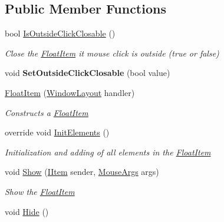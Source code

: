 \subsection*{Public Member Functions}
\begin{DoxyCompactItemize}
\item 
bool \mbox{\hyperlink{class_space_v_i_l_1_1_float_item_a491aaaddc768c4676ecfb5c7405ec167}{Is\+Outside\+Click\+Closable}} ()
\begin{DoxyCompactList}\small\item\em Close the \mbox{\hyperlink{class_space_v_i_l_1_1_float_item}{Float\+Item}} it mouse click is outside (true or false) \end{DoxyCompactList}\item 
\mbox{\label{class_space_v_i_l_1_1_float_item_a1e7c8a8d2ba5875d5bc9713a35ea4d36}} 
void {\bfseries Set\+Outside\+Click\+Closable} (bool value)
\item 
\mbox{\hyperlink{class_space_v_i_l_1_1_float_item_af80858fea5cd334aeea694ad34f9e9e6}{Float\+Item}} (\mbox{\hyperlink{class_space_v_i_l_1_1_window_layout}{Window\+Layout}} handler)
\begin{DoxyCompactList}\small\item\em Constructs a \mbox{\hyperlink{class_space_v_i_l_1_1_float_item}{Float\+Item}} \end{DoxyCompactList}\item 
override void \mbox{\hyperlink{class_space_v_i_l_1_1_float_item_adf2e88b89c3ce9ec105fae8ac66390e4}{Init\+Elements}} ()
\begin{DoxyCompactList}\small\item\em Initialization and adding of all elements in the \mbox{\hyperlink{class_space_v_i_l_1_1_float_item}{Float\+Item}} \end{DoxyCompactList}\item 
void \mbox{\hyperlink{class_space_v_i_l_1_1_float_item_a7b352daad024029b2816939c0736aa66}{Show}} (\mbox{\hyperlink{interface_space_v_i_l_1_1_core_1_1_i_item}{I\+Item}} sender, \mbox{\hyperlink{class_space_v_i_l_1_1_core_1_1_mouse_args}{Mouse\+Args}} args)
\begin{DoxyCompactList}\small\item\em Show the \mbox{\hyperlink{class_space_v_i_l_1_1_float_item}{Float\+Item}} \end{DoxyCompactList}\item 
void \mbox{\hyperlink{class_space_v_i_l_1_1_float_item_a7087e7124eae00d372a68b9966a2548d}{Hide}} ()

\end{DoxyCompactItemize}
